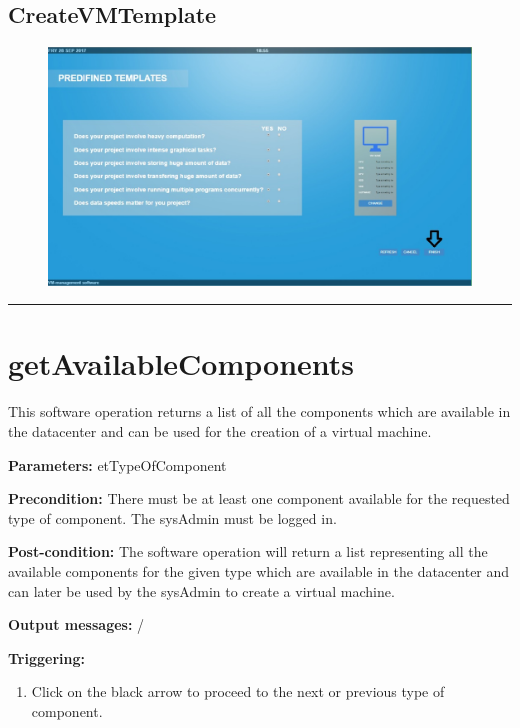 \subsection{CreateVMTemplate}

\begin{figure}[H]
\centering
\includegraphics[width=170mm]{images/softVMTemplate.eps}
\caption{\label{overflow}}
\end{figure}


\hrule
\vspace{0.5cm}













\section{getAvailableComponents}
\label{operation:getAvailableComponents}
This software operation returns a list of all the components which are available
in the datacenter and can be used for the creation of a virtual machine.
\begin{description}

\item \textbf{Parameters:} etTypeOfComponent
\item \textbf{Precondition:} There must be at least one component available for
the requested type of component. The sysAdmin must be logged in.
\item \textbf{Post-condition:} The software operation will return a list
representing all the available components for the given type which are available
in the datacenter and can later be used by the sysAdmin to create a virtual machine.

\item \textbf{Output messages:} /

\item \textbf{Triggering:}
\begin{enumerate}
\item Click on the black arrow to proceed to the next or previous type of
component.
\end{enumerate}

 
\end{description}

